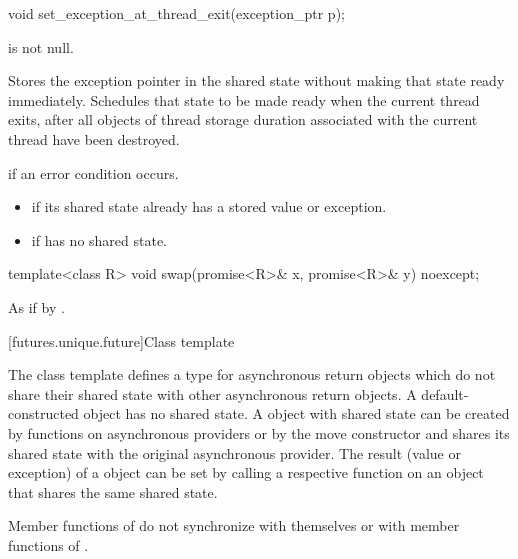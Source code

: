%
\begin{itemdecl}
void set_exception_at_thread_exit(exception_ptr p);
\end{itemdecl}

\begin{itemdescr}
\pnum
\expects
{} is not null.

\pnum
\effects
Stores the exception pointer  in the shared state without
making that state ready immediately. Schedules that state to be made ready when
the current thread exits, after all objects of thread storage duration
associated with the current thread have been destroyed.

\pnum
\throws
{} if an error condition occurs.

\pnum
\errors
\begin{itemize}
\item {} if its shared state
already has a stored value or exception.
\item {} if  has no shared state.
\end{itemize}
\end{itemdescr}

%
\begin{itemdecl}
template<class R>
  void swap(promise<R>& x, promise<R>& y) noexcept;
\end{itemdecl}

\begin{itemdescr}
\pnum
\effects
As if by .
\end{itemdescr}

[futures.unique.future]{Class template }

\pnum
The class template  defines a type for asynchronous return objects which
do not share their shared state with other asynchronous return objects.
A default-constructed  object has no
shared state. A  object with shared state can be created by
functions on asynchronous providers or by the move constructor
and shares its shared state with
the original asynchronous provider. The result (value or exception) of
a  object
can be
set by
calling a respective function on an
object that shares the same
shared state.

\pnum
\begin{note}
Member functions of  do not synchronize with themselves or with
member functions of .
\end{note}

